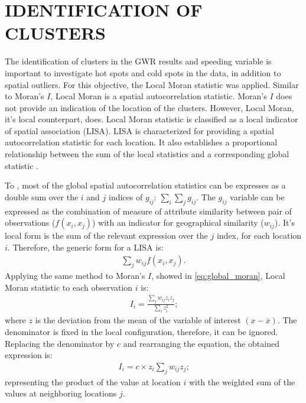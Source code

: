 \section{IDENTIFICATION OF CLUSTERS} \label{sec:cluster}




The identification of clusters in the GWR results and speeding variable is important to investigate hot spots and cold spots in the data, in addition to spatial outliers. For this objective, the Local Moran statistic was applied. Similar to Moran's $I$, Local Moran is a spatial autocorrelation statistic. Moran's $I$ does not provide an indication of the location of the clusters. However, Local Moran, it's local counterpart, does. Local Moran statistic is classified as a local indicator of spatial association (LISA). LISA is characterized for providing a spatial autocorrelation statistic for each location. It also establishes a proportional relationship between the sum of the local statistics and a corresponding global statistic \cite{anselinLocalIndicatorsSpatial2010,anselinLocalSpatialAutocorrelation2020}.

To \textcite{anselinLocalSpatialAutocorrelation2020}, most of the global spatial autocorrelation statistics can be expresses as a double sum over the $i$ and $j$ indices of $g_{ij}$: $\sum_i \sum_j g_{ij}$. The $g_{ij}$ variable can be expressed as the combination of measure of attribute similarity between pair of observations ($f(x_i, x_j)$) with an indicator for geographical similarity ($w_{ij}$). It's local form is the sum of the relevant expression over the $j$ index, for each location $i$. Therefore, the generic form for a LISA is: \begin{align}
    \sum_j w_{ij} f\left(x_i, x_j\right) \mbox{.}
\end{align} Applying the same method to Moran's $I$, showed in \autoref{eq:global_moran}, Local Moran statistic to each observation $i$ is: \begin{align}
    I_i = \frac{\sum_j w_{ij} z_i z_j}{\sum_i z_i^2} \mbox{;}
\end{align} where $z$ is the deviation from the mean of the variable of interest $(x - \overline{x})$. The denominator is fixed in the local configuration, therefore, it can be ignored. Replacing the denominator by $c$ and rearranging the equation, the obtained expression is: \begin{align}
    I_i = c \times z_i \sum_j w_{ij} z_j \mbox{;}
\end{align} representing the product of the value at location $i$ with the weighted sum of the values at neighboring locations $j$.

